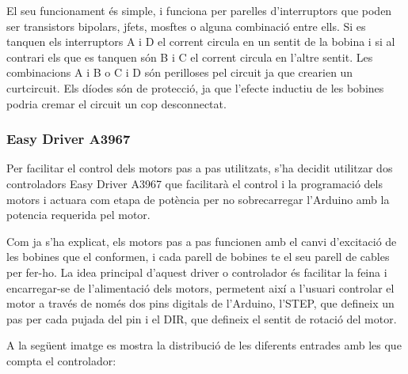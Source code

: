 El seu funcionament és simple, i funciona per parelles d'interruptors que poden ser transistors bipolars, jfets, mosftes o alguna combinació entre ells. Si es tanquen els interruptors A i D el corrent circula en un sentit de la bobina i si al contrari els que es tanquen són B i C el corrent circula en l'altre sentit. Les combinacions A i B o C i D són perilloses pel circuit ja que crearien un curtcircuit. Els díodes són de protecció, ja que l'efecte inductiu de les bobines podria cremar el circuit un cop desconnectat.


\subsubsection{Easy Driver A3967}
Per facilitar el control dels motors pas a pas utilitzats, s'ha decidit utilitzar dos controladors Easy Driver A3967 que facilitarà el control i la programació dels motors i actuara com etapa de potència per no sobrecarregar l'Arduino amb la potencia requerida pel motor.


Com ja s'ha explicat, els motors pas a pas funcionen amb el canvi d'excitació de les bobines que el conformen, i cada parell de bobines te el seu parell de cables per fer-ho. La idea principal d'aquest driver o controlador és facilitar la feina i encarregar-se de l'alimentació dels motors, permetent així a l'usuari controlar el motor a través de només dos pins digitals de l'Arduino, l'STEP, que defineix un pas per cada pujada del pin i el DIR, que defineix el sentit de rotació del motor. 


A la següent imatge es mostra la distribució de les diferents entrades amb les que compta el controlador:

